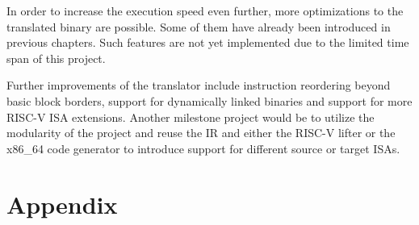 \documentclass[course=eragp]{aspdoc}
\begin{document}
In order to increase the execution speed even further,
more optimizations to the translated binary are possible. Some of them have
already been introduced in previous chapters. Such features are not yet implemented due to the
limited time span of this project.

\par

Further improvements of the translator include instruction reordering beyond basic block borders,
support for dynamically linked binaries and support for more RISC-V ISA extensions. Another milestone project would
be to utilize the modularity of the project and reuse the IR and either the RISC-V lifter or the
x86\_64 code generator to introduce support for different source or target ISAs.


\clearpage


{}

\appendix
\section{Appendix}
\end{document}
